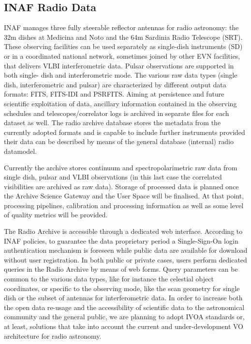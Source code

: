 \documentclass[11pt,a4paper]{ivoatex/ivoa}
\begin{document}
{\subsection{INAF Radio Data}
\label{sec:INAF}
INAF manages three fully steerable reflector antennas for radio astronomy: the 32m dishes at Medicina 
and Noto and the 64m Sardinia Radio Telescope (SRT). These observing facilities can be used separately 
as single-dish instruments (SD) or in a coordinated national network, sometimes joined by other EVN 
facilities, that delivers VLBI interferometric data. Pulsar observations are supported in both single-
dish and interferometric mode. The various raw data types (single dish, interferometric and pulsar) are 
characterized by different output data formats: FITS, FITS-IDI and PSRFITS. Aiming at persistence and 
future scientific exploitation of data, ancillary information contained in the observing schedules and 
telescopes/correlator logs is archived in separate files for each dataset as well. The radio archive 
database stores the metadata from the currently adopted formats and is capable to include further 
instruments provided their data can be described by means of the general database (internal) radio 
datamodel.

Currently the archive stores continuum and spectropolarimetric raw data from single dish, pulsar and 
VLBI observations (in this last case the correlated visibilities are archived as raw data). Storage of 
processed data is planned once the Archive Science Gateway and the User Space will be finalised. At that 
point, processing pipelines, calibration and processing information as well as some level of quality 
metrics will be provided.

The Radio Archive is accessible through a dedicated web interface. According to INAF policies, to 
guarantee the data proprietary period a Single-Sign-On login authentication mechanism is foreseen while 
public data are available for download without user registration. In both public or private cases, users 
perform dedicated queries in the Radio Archive by means of web forms. Query parameters can be common to 
the various data types, like for instance the celestial object coordinates, or specific to the observing 
mode, like the scan geometry for single dish or the subset of antennas for interferometric data. In 
order to increase both the open data re-usage and the accessibility of scientific data to the 
astronomical community and the general public, we are planning to adopt IVOA standards or, at least, 
solutions that take into account the current and under-development VO architecture for radio astronomy.

}
\end{document}
